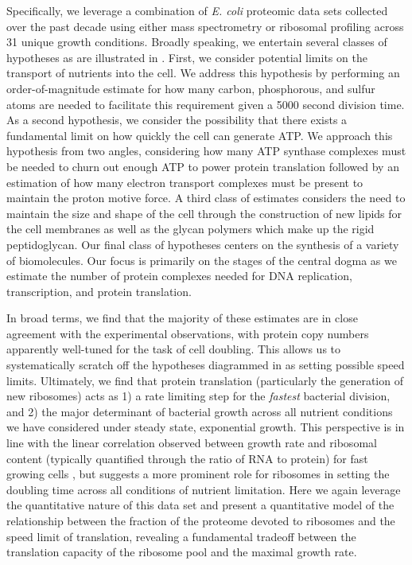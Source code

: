 
Specifically, we leverage a combination of \textit{E. coli} proteomic data
sets collected over the past decade using either mass spectrometry
\citep{schmidt2016,peebo2015, valgepea2013} or ribosomal profiling
\citep{li2014} across 31 unique growth conditions. Broadly speaking, we
entertain several classes of hypotheses as are illustrated in
. First, we consider potential limits on the transport of
nutrients into the cell. We address this hypothesis by performing an
order-of-magnitude estimate for how many carbon, phosphorous, and sulfur
atoms are needed to facilitate this requirement given a 5000 second division
time. As a second hypothesis, we consider the possibility that there exists a
fundamental limit on how quickly the cell can generate ATP. We approach this
hypothesis from two angles, considering how many ATP synthase complexes must
be needed to churn out enough ATP to power protein translation followed by an
estimation of how many electron transport complexes must be present to
maintain the proton motive force. A third class of estimates considers the
need to maintain the size and shape of the cell through the construction of
new lipids for the cell membranes as well as the glycan polymers which make
up the rigid peptidoglycan. Our final class of hypotheses centers on the
synthesis of a variety of biomolecules. Our focus is primarily on the stages
of the central dogma as we estimate the number of protein complexes needed
for DNA replication, transcription, and protein translation.

In broad terms, we find that the majority of these estimates are in close
agreement with the experimental observations, with
protein copy numbers apparently well-tuned for the task of cell doubling. This
allows us to systematically scratch off the hypotheses diagrammed in
 as setting possible speed limits. Ultimately, we find that
protein translation (particularly the generation of new ribosomes) acts as 1) a
rate limiting step for the \textit{fastest} bacterial division, and 2) the major
determinant of bacterial growth across all nutrient conditions we have
considered under steady state, exponential growth. This perspective is in line
with the linear correlation observed between growth rate and ribosomal content
(typically quantified through the ratio of RNA to protein) for fast growing cells
\citep{scott2010}, but suggests a more prominent role for ribosomes in setting
the doubling time across all conditions of nutrient limitation. Here we
again leverage the quantitative nature of this data set and present a
quantitative model of the relationship between the fraction of the proteome
devoted to ribosomes and the speed limit of translation, revealing a fundamental
tradeoff between the translation capacity of the ribosome pool and the maximal
growth rate.

